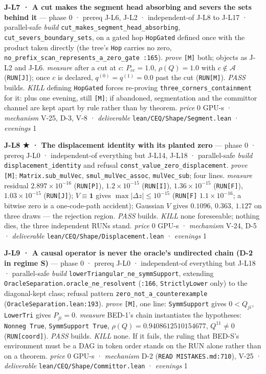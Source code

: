 \documentclass[11pt,a4paper]{article}
\newcounter{none}                 %
\theoremstyle{plain}
\theoremstyle{definition}
\theoremstyle{remark}
\begin{document}
\textbf{J-L7 · A cut makes the segment head absorbing and severs the
sets behind it} --- phase 0 · prereq J-L6, J-L2 · independent-of J-L8 to
J-L17 · parallel-safe \emph{build}
\texttt{cut\_makes\_segment\_head\_absorbing},
\texttt{cut\_severs\_boundary\_sets}, on a gated hop \texttt{HopGated}
defined once with the product taken directly (the tree's \texttt{Hop}
carries no zero,
\texttt{no\_prefix\_scan\_represents\_a\_zero\_gate\ :165}).
\emph{prove} \texttt{{[}M{]}} both; objects as J-L2 and J-L6.
\emph{measure} after a cut at \(c\): \(P_{cc}=1.0\), \(\rho(Q)=1.0\)
with \(c\notin\mathcal{A}\) (\texttt{RUN{[}J{]}}); once \(c\) is
declared, \(q^{(0)}=q^{(1)}=0.0\) past the cut (\texttt{RUN{[}M{]}}).
\emph{PASS} builds. \emph{KILL} defining \texttt{HopGated} forces
re-proving \texttt{three\_corners\_containment} for it: plus one
evening, still \texttt{{[}M{]}}; if abandoned, segmentation and the
committor channel are kept apart by rule rather than by theorem.
\emph{price} \(0\) GPU-s · \emph{mechanism} V-25, D-3, V-8 ·
\emph{deliverable} \texttt{lean/CEQ/Shape/Segment.lean} ·
\emph{evenings} 1

\textbf{J-L8 ★ · The displacement identity with its planted zero} ---
phase 0 · prereq J-L0 · independent-of everything but J-L14, J-L18 ·
parallel-safe \emph{build} \texttt{displacement\_identity} and refusal
\texttt{const\_value\_zero\_displacement}. \emph{prove}
\texttt{{[}M{]}}; \texttt{Matrix.sub\_mulVec},
\texttt{smul\_mulVec\_assoc}, \texttt{mulVec\_sub}; four lines.
\emph{measure} residual \(2.897\times10^{-16}\) (\texttt{RUN{[}P{]}}),
\(1.2\times10^{-15}\) (\texttt{RUN{[}I{]}}), \(1.36\times10^{-15}\)
(\texttt{RUN{[}F{]}}), \(1.03\times10^{-15}\) (\texttt{RUN{[}J{]}});
\(V\equiv\mathbf 1\) gives \(\max|\Delta z|\le10^{-15}\)
(\texttt{RUN{[}F{]}} \(1.1\times10^{-16}\); a bitwise zero is a
one-code-path accident); Gaussian \(V\) gives \(0.1096\), \(0.363\),
\(1.127\) on three draws --- the rejection region. \emph{PASS} builds.
\emph{KILL} none foreseeable; nothing dies, the three independent RUNs
stand. \emph{price} \(0\) GPU-s · \emph{mechanism} V-24, D-5 ·
\emph{deliverable} \texttt{lean/CEQ/Shape/Displacement.lean} ·
\emph{evenings} 1

\textbf{J-L9 · A causal operator is never the oracle's undirected chain
(D-2 in regime S)} --- phase 0 · prereq J-L0 · independent-of everything
but J-L18 · parallel-safe \emph{build}
\texttt{lowerTriangular\_ne\_symmSupport}, extending
\texttt{OracleSeparation.oracle\_ne\_resolvent} (\texttt{:166},
\texttt{StrictlyLower} only) to the diagonal-kept class; refusal pattern
\texttt{zero\_not\_a\_counterexample}
(\texttt{OracleSeparation.lean:193}). \emph{prove} \texttt{{[}M{]}}, one
line: \texttt{SymmSupport} gives \(0<Q_{ji}\), \texttt{LowerTri} gives
\(P_{ji}=0\). \emph{measure} BED-1's chain instantiates the hypotheses:
\texttt{Nonneg\ True}, \texttt{SymmSupport\ True},
\(\rho(Q)=0.9408612510154677\), \(Q^{11}\ne0\)
(\texttt{RUN{[}coord{]}}). \emph{PASS} builds. \emph{KILL} none. If it
fails, the ruling that BED-S's environment must be a DAG in token order
stands on the RUN alone rather than on a theorem. \emph{price} \(0\)
GPU-s · \emph{mechanism} D-2 (\texttt{READ\ MISTAKES.md:710}), V-25 ·
\emph{deliverable} \texttt{lean/CEQ/Shape/Committor.lean} ·
\emph{evenings} 1
\end{document}
